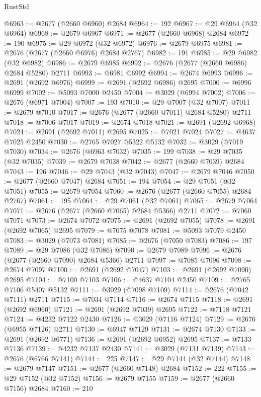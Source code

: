 \begin{lexlean}{RustStd}
\begin{coremodule}
@6963 := @2677 (@2660 @6960) @2684
@6964 := 192
@6967 := @29 @6964 (@32 @6964)
@6968 := @2679 @6967
@6971 := @2677 (@2660 @6968) @2684
@6972 := 190
@6975 := @29 @6972 (@32 @6972)
@6976 := @2679 @6975
@6981 := @2676 (@2677 (@2660 @6976) @2684 @2767)
@6982 := 191
@6985 := @29 @6982 (@32 @6982)
@6986 := @2679 @6985
@6992 := @2676 (@2677 (@2660 @6986) @2684 @5280) @2711
@6993 := @6981 @6992
@6994 := @2674 @6993
@6996 := @2691 (@2692 @6976)
@6999 := @2691 (@2692 @6986) @2695
@7000 := @6996 @6999
@7002 := @5093 @7000 @2450
@7004 := @3029 (@6994 @7002)
@7006 := @2676 (@6971 @7004)
@7007 := 193
@7010 := @29 @7007 (@32 @7007)
@7011 := @2679 @7010
@7017 := @2676 (@2677 (@2660 @7011) @2684 @5280) @2711
@7018 := @7006 @7017
@7019 := @2674 @7018
@7021 := @2691 (@2692 @6968)
@7024 := @2691 (@2692 @7011) @2695
@7025 := @7021 @7024
@7027 := @4637 @7025 @2450
@7030 := @2765 @7027 @5322 @5132
@7032 := @3029 (@7019 @7030)
@7034 := @2676 (@6963 @7032)
@7035 := 199
@7038 := @29 @7035 (@32 @7035)
@7039 := @2679 @7038
@7042 := @2677 (@2660 @7039) @2684
@7043 := 196
@7046 := @29 @7043 (@32 @7043)
@7047 := @2679 @7046
@7050 := @2677 (@2660 @7047) @2684
@7051 := 194
@7054 := @29 @7051 (@32 @7051)
@7055 := @2679 @7054
@7060 := @2676 (@2677 (@2660 @7055) @2684 @2767)
@7061 := 195
@7064 := @29 @7061 (@32 @7061)
@7065 := @2679 @7064
@7071 := @2676 (@2677 (@2660 @7065) @2684 @5366) @2711
@7072 := @7060 @7071
@7073 := @2674 @7072
@7075 := @2691 (@2692 @7055)
@7078 := @2691 (@2692 @7065) @2695
@7079 := @7075 @7078
@7081 := @5093 @7079 @2450
@7083 := @3029 (@7073 @7081)
@7085 := @2676 (@7050 @7083)
@7086 := 197
@7089 := @29 @7086 (@32 @7086)
@7090 := @2679 @7089
@7096 := @2676 (@2677 (@2660 @7090) @2684 @5366) @2711
@7097 := @7085 @7096
@7098 := @2674 @7097
@7100 := @2691 (@2692 @7047)
@7103 := @2691 (@2692 @7090) @2695
@7104 := @7100 @7103
@7106 := @4637 @7104 @2450
@7109 := @2765 @7106 @5407 @5132
@7111 := @3029 (@7098 @7109)
@7114 := @2676 (@7042 @7111) @2711
@7115 := @7034 @7114
@7116 := @2674 @7115
@7118 := @2691 (@2692 @6960)
@7121 := @2691 (@2692 @7039) @2695
@7122 := @7118 @7121
@7124 := @4232 @7122 @2430
@7126 := @3029 (@7116 @7124)
@7129 := @2676 (@6955 @7126) @2711
@7130 := @6947 @7129
@7131 := @2674 @7130
@7133 := @2691 (@2692 @6771)
@7136 := @2691 (@2692 @6952) @2695
@7137 := @7133 @7136
@7139 := @4232 @7137 @2430
@7141 := @3029 (@7131 @7139)
@7143 := @2676 (@6766 @7141)
@7144 := 225
@7147 := @29 @7144 (@32 @7144)
@7148 := @2679 @7147
@7151 := @2677 (@2660 @7148) @2684
@7152 := 222
@7155 := @29 @7152 (@32 @7152)
@7156 := @2679 @7155
@7159 := @2677 (@2660 @7156) @2684
@7160 := 210

\end{coremodule}
\end{lexlean}
